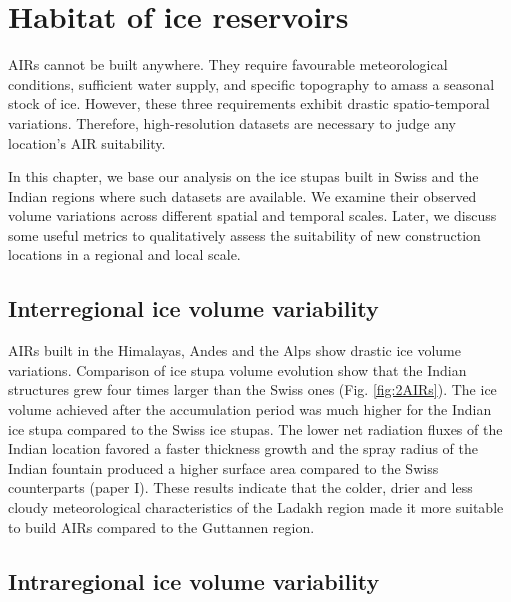 \chapter{Habitat of ice reservoirs}


\ac{AIRs} cannot be built anywhere. They require favourable meteorological conditions, sufficient water supply,
and specific topography to amass a seasonal stock of ice. However, these three requirements exhibit drastic
spatio-temporal variations. Therefore, high-resolution datasets are necessary to judge any location's AIR
suitability.


In this chapter, we base our analysis on the ice stupas built in Swiss and the Indian regions where such
datasets are available. We examine their observed volume variations across different spatial and temporal scales.
Later, we discuss some useful metrics to qualitatively assess the suitability of new construction locations in a
regional and local scale.

\section{Interregional ice volume variability}

\ac{AIRs} built in the Himalayas, Andes and the Alps show drastic ice volume variations. Comparison of ice stupa
volume evolution show that the Indian structures grew four times larger than the Swiss ones (Fig.
\ref{fig:2AIRs}). The ice volume achieved after the accumulation period was much higher for the Indian ice stupa
compared to the Swiss ice stupas. The lower net radiation fluxes of the Indian location favored a faster
thickness growth and the spray radius of the Indian fountain produced a higher surface area compared to the
Swiss counterparts (paper I). These results indicate that the colder, drier and less cloudy meteorological
characteristics of the Ladakh region made it more suitable to build \ac{AIRs} compared to the Guttannen region.

\section{Intraregional ice volume variability}

